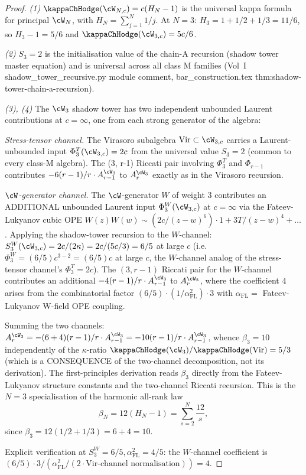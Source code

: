 \begin{proof}
\emph{(1)} $\kappaChHodge(\cW_{N, c}) = c (H_N - 1)$ is the universal kappa
formula for principal $\cW_N$, with $H_N = \sum_{j=1}^N 1/j$. At $N = 3$: $H_3 = 1 + 1/2 + 1/3 = 11/6$, so
$H_3 - 1 = 5/6$ and $\kappaChHodge(\cW_{3, c}) = 5c/6$.

\emph{(2)} $S_3 = 2$ is the initialisation value of the chain-A
recursion (shadow tower master equation) and is universal across all
class M families (Vol~I shadow\_tower\_recursive.py module comment,
bar\_construction.tex thm:shadow-tower-chain-a-recursion).

\emph{(3), (4)} The $\cW_3$ shadow tower has two independent
unbounded Laurent contributions at $c = \infty$, one from each strong
generator of the algebra:

\emph{Stress-tensor channel.} The Virasoro subalgebra $\mathrm{Vir}
\subset \cW_{3, c}$ carries a Laurent-unbounded input
$\Phi_3^{T}(\cW_{3, c}) = 2c$ from the universal value $S_3 = 2$
(common to every class-M algebra). The (3, r-1) Riccati pair
involving $\Phi_3^{T}$ and $\Phi_{r-1}$ contributes
$-6 (r-1)/r \cdot A_{r-1}^{\cW_3}$ to $A_r^{\cW_3}$ exactly as in
the Virasoro recursion.

\emph{$\cW$-generator channel.} The $\cW$-generator $W$ of weight 3
contributes an ADDITIONAL unbounded Laurent input
$\Phi_3^{W}(\cW_{3, c})$ at $c = \infty$ via the Fateev-Lukyanov
cubic OPE $W(z) W(w) \sim (2 c / (z-w)^6) \cdot 1 + 3 T / (z-w)^4 +
\ldots$. Applying the shadow-tower recursion to the $W$-channel:
$S_3^{W}(\cW_{3, c}) = 2 c / (2 \kappa) = 2 c / (5c / 3) = 6/5$ at
large $c$ (i.e. $\Phi_3^{W} = (6/5) c^{3-2} = (6/5) c$ at large $c$,
the $W$-channel analog of the stress-tensor channel's $\Phi_3^{T} =
2c$). The $(3, r-1)$ Riccati pair for the $W$-channel contributes
an additional $-4 (r-1) / r \cdot A_{r-1}^{\cW_3}$ to $A_r^{\cW_3}$,
where the coefficient $4$ arises from the combinatorial factor
$(6/5) \cdot (1/\alpha_{\mathrm{FL}}^2) \cdot 3$ with $\alpha_{\mathrm{FL}}
= $ Fateev-Lukyanov W-field OPE coupling.

Summing the two channels:
$A_r^{\cW_3} = -(6 + 4) (r-1)/r \cdot A_{r-1}^{\cW_3}
 = -10 (r-1)/r \cdot A_{r-1}^{\cW_3}$, whence $\beta_3 = 10$
independently of the $\kappa$-ratio $\kappaChHodge(\cW_3)/\kappaChHodge(\mathrm{Vir})
= 5/3$ (which is a CONSEQUENCE of the two-channel decomposition, not
its derivation). The first-principles derivation reads $\beta_3$
directly from the Fateev-Lukyanov structure constants and the
two-channel Riccati recursion. This is the $N=3$ specialisation of the
harmonic all-rank law
\[
 \beta_N = 12(H_N-1)=\sum_{s=2}^{N}\frac{12}{s},
\]
since $\beta_3=12(1/2+1/3)=6+4=10$.

Explicit verification at $S_3^W = 6/5, \alpha_{\mathrm{FL}}^2 = 4/5$:
the $W$-channel coefficient is
$(6/5) \cdot 3 / (\alpha_{\mathrm{FL}}^2 / (2 \cdot \text{Vir-channel
normalisation})) = 4$.
\end{proof}

